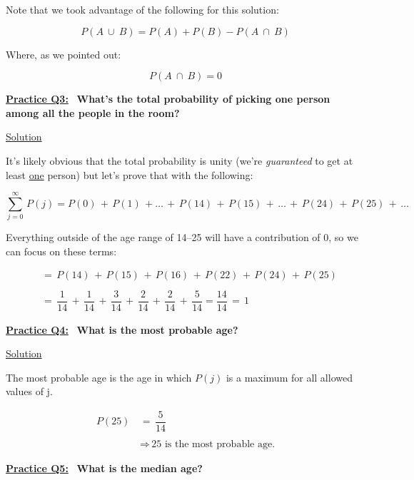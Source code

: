 Note that we took advantage of the following for this solution:

\[
    P(A \ \cup \ B) = P(A) + P(B) - P(A \ \cap \ B)
\]


Where, as we pointed out:

\[
    P(A \ \cap \ B) = 0
\]

\bigskip \bigskip

\underline{\textbf{Practice Q3:}} \ \textbf{What's the total probability of
picking one person among all the people in the room?}

\bigskip

\underline{Solution}

It's likely obvious that the total probability is unity (we're
\textit{guaranteed} to get at least \underline{one} person) but let's prove
that with the following:

\[
    \sum_{j=0}^{\infty} \, P(j) = P(0) \, + \, P(1) \, + \dots \, + \, P(14) \,
    + \, P(15) \, + \, \dots \, + \, P(24) \, + \, P(25) \, + \, \dots
\]

Everything outside of the age range of 14--25 will have a contribution of 0,
so we can focus on these terms:

\begin{align*}
    &= \, P(14) \, + \, P(15) \, + \, P(16) \, + \, P(22) \, + \, P(24) \, + \,
    P(25) \\ \\
    &= \, \dfrac{1}{14} \, + \, \dfrac{1}{14} \, + \, \dfrac{3}{14} \, + \,
    \dfrac{2}{14} \, + \, \dfrac{2}{14} \, + \, \dfrac{5}{14} = \dfrac{14}{14}
    \, = \, \boxed{1}
\end{align*}

\newpage

\underline{\textbf{Practice Q4:}} \ \textbf{What is the most probable age?}

\bigskip

\underline{Solution}

The most probable age is the age in which $P(j)$ is a maximum for all allowed
values of j.

\begin{align*}
    P(25) \, &= \, \dfrac{5}{14} \\ \\
    &\Rightarrow \, \boxed{\text{25 is the most probable age.}}
\end{align*}

\bigskip \bigskip

\underline{\textbf{Practice Q5:}} \ \textbf{What is the median age?}

